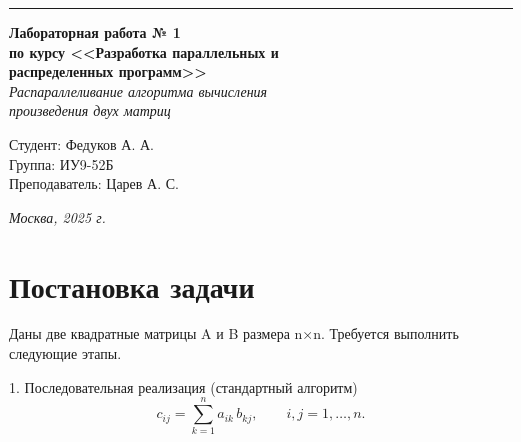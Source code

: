 \documentclass[a4paper, 14pt]{extarticle}
\begin{document}
\begin{titlepage}
\vspace*{-16pt}
\hspace{30pt}\rule{0.866\textwidth}{0.4pt}
  
\vspace{11em}

\begin{center}
\Large {\bf Лабораторная работа № 1} \\ 
\large {\bf по курсу <<Разработка параллельных и \\ распределенных программ>>} \\
\textit{Распараллеливание алгоритма вычисления \\ произведения двух матриц}

\end{center}\normalsize

\vspace{8em}


\begin{flushright}
 \begin{minipage}{0.5\linewidth}
      {Студент: Федуков А. А. \hspace*{15pt}\\ 
      Группа: ИУ9-52Б \\ 
      Преподаватель: Царев А. С. \hspace*{15pt}}
  \end{minipage}
\end{flushright}
\bigskip
\vfill
\begin{center}
\textsl{Москва, 2025 г.}
\end{center}
\end{titlepage}

\renewcommand{\ttdefault}{pcr}

\setlength{\tabcolsep}{3pt}
\newpage
\setcounter{page}{2}

{
  \hypersetup{linkcolor=black}
  \tableofcontents
}


\section*{Постановка задачи}\label{Sect::goal}
Даны две квадратные матрицы A и B размера n×n. Требуется выполнить следующие этапы.

1. Последовательная реализация (стандартный алгоритм)
  $$
    c_{ij}=\sum_{k=1}^{n} a_{ik}\,b_{kj},\qquad i,j=1,\dots,n.
  $$
\end{document}
